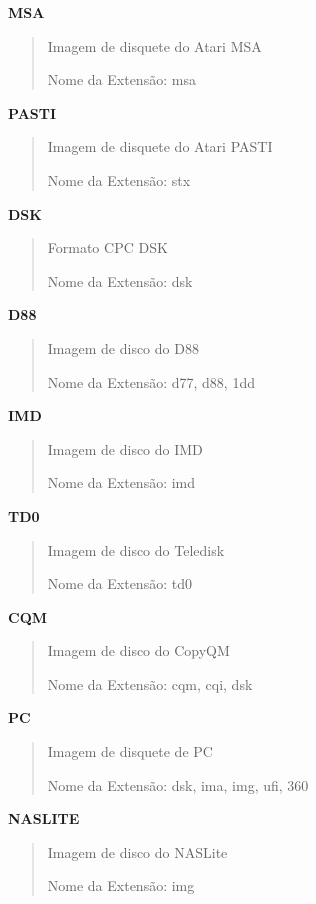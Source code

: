 \documentclass[letterpaper,10pt,brazil]{sphinxmanual}
\begin{document}
\textbf{MSA}
\begin{quote}

Imagem de disquete do Atari MSA

Nome da Extensão: msa
\end{quote}

\textbf{PASTI}
\begin{quote}

Imagem de disquete do Atari PASTI

Nome da Extensão: stx
\end{quote}

\textbf{DSK}
\begin{quote}

Formato CPC DSK

Nome da Extensão: dsk
\end{quote}

\textbf{D88}
\begin{quote}

Imagem de disco do D88

Nome da Extensão: d77, d88, 1dd
\end{quote}

\textbf{IMD}
\begin{quote}

Imagem de disco do IMD

Nome da Extensão: imd
\end{quote}

\textbf{TD0}
\begin{quote}

Imagem de disco do Teledisk

Nome da Extensão: td0
\end{quote}

\textbf{CQM}
\begin{quote}

Imagem de disco do CopyQM

Nome da Extensão: cqm, cqi, dsk
\end{quote}

\textbf{PC}
\begin{quote}

Imagem de disquete de PC

Nome da Extensão: dsk, ima, img, ufi, 360
\end{quote}

\textbf{NASLITE}
\begin{quote}

Imagem de disco do NASLite

Nome da Extensão: img
\end{quote}
\end{document}
